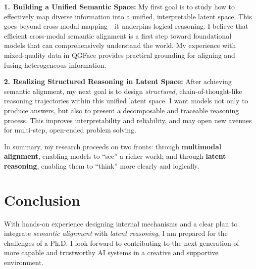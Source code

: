 \documentclass[11pt, letterpaper]{article}
\begin{document}
\textbf{1. Building a Unified Semantic Space:} My first goal is to study how to effectively map diverse information into a unified, interpretable latent space. This goes beyond cross-modal mapping—it underpins logical reasoning. I believe that efficient cross-modal semantic alignment is a first step toward foundational models that can comprehensively understand the world. My experience with mixed-quality data in QGFace provides practical grounding for aligning and fusing heterogeneous information.

\textbf{2. Realizing Structured Reasoning in Latent Space:} After achieving semantic alignment, my next goal is to design \emph{structured}, chain-of-thought-like reasoning trajectories within this unified latent space. I want models not only to produce answers, but also to present a decomposable and traceable reasoning process. This improves interpretability and reliability, and may open new avenues for multi-step, open-ended problem solving.

In summary, my research proceeds on two fronts: through \textbf{multimodal alignment}, enabling models to “see” a richer world; and through \textbf{latent reasoning}, enabling them to “think” more clearly and logically.

\section{Conclusion}

With hands-on experience designing internal mechanisms and a clear plan to integrate \emph{semantic alignment} with \emph{latent reasoning}, I am prepared for the challenges of a Ph.D. I look forward to contributing to the next generation of more capable and trustworthy AI systems in a creative and supportive environment.



\end{document}
